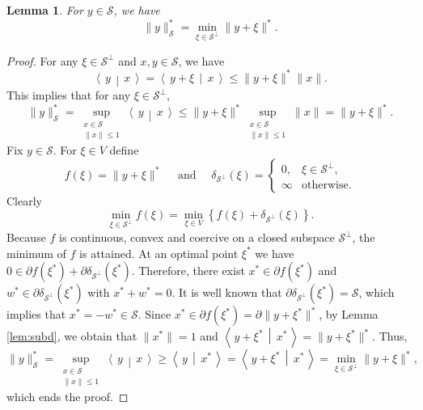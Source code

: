 \documentclass[12pt]{amsart}
\numberwithin{equation}{section}
\numberwithin{equation}{section}
\newtheorem{lemma}[thm]{Lemma}
\theoremstyle{definition}
\renewcommand{\SS}{\mathcal{S}}
\newcommand{\scalar}[2]{\left\langle\,#1\,\middle|\,#2\,\right\rangle}
\begin{document}
\begin{lemma}
	For $y\in\SS$, we have
	\[
	\|y\|_\SS^\ast = \min_{\xi\in \SS^\bot} \|y+\xi\|^\ast. 
	\]
\end{lemma}
\begin{proof}
	For any $\xi\in\SS^\bot$ and $x, y\in\SS$, we have 
	\[
	\scalar{y}{x} = \scalar{y+\xi}{x}\leq \|y+\xi\|^\ast \|x\|.
	\]
	This implies that for any $\xi\in \SS^\bot$,
	\[
	\|y\|_\SS^\ast = \sup_{\substack{x\in \SS\\\|x\|\leq 1}}  \scalar{y}{x} \leq \|y+\xi\|^\ast \sup_{\substack{x\in \SS\\\|x\|\leq 1}} \|x\|  = \|y+\xi\|^\ast.
	\]
	Fix $y\in\SS$. For $\xi\in V$ define 
	\[
	f(\xi)=\|y+\xi\|^\ast\quad \mbox{ and }\quad\delta_{\SS^\bot}(\xi) = \begin{cases} 0, & \xi \in \SS^\bot, \\ \infty & \mbox{otherwise}.\end{cases}
	\]
	Clearly 
	\[
	\min_{\xi\in\SS^\bot} f(\xi) = \min_{\xi\in V} \left\{ f(\xi)+\delta_{\SS^\bot}(\xi)\right\}.
	\]
	Because $f$ is continuous, convex and coercive on a closed subspace $\SS^\bot$, the minimum of $f$ is attained. 
	At an optimal point $\xi^\ast$ we have
	$0\in \partial f(\xi^\ast)+\partial\delta_{\SS^\bot}(\xi^\ast)$. Therefore, there exist $x^\ast\in \partial f(\xi^\ast)$ and $w^\ast\in \partial\delta_{\SS^\bot}(\xi^\ast)$ with $x^\ast+w^\ast=0$.  It is well known that $\partial\delta_{\SS^\bot}(\xi^\ast)=\SS$, which implies that $x^\ast=-w^\ast\in\SS$. Since $x^\ast\in \partial f(\xi^\ast)=\partial \|y+\xi^\ast\|^\ast$, by Lemma \ref{lem:subd}, we obtain that $\|x^\ast\|= 1$ and 
	$\scalar{y+\xi^\ast}{x^\ast} = \|y+\xi^\ast\|^\ast$.    Thus, 
	\[
	\|y\|_\SS^\ast = \sup_{\substack{x\in \SS\\\|x\|\leq 1}}  \scalar{y}{x} \geq \scalar{y}{x^\ast} = \scalar{y+\xi^\ast}{x^\ast}=\min_{\xi\in\SS^\bot}\|y+\xi\|^\ast,
	\]
	which ends the proof.
\end{proof}
\end{document}
